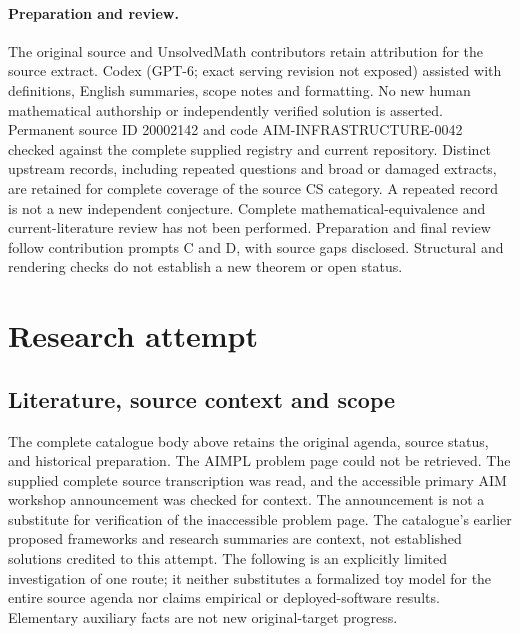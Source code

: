 \documentclass[11pt]{article}
\begin{document}
\paragraph{Preparation and review.}
The original source and UnsolvedMath contributors retain attribution for the source extract. Codex (GPT-6; exact serving revision not exposed) assisted with definitions, English summaries, scope notes and formatting. No new human mathematical authorship or independently verified solution is asserted. Permanent source ID 20002142 and code AIM-INFRASTRUCTURE-0042 checked against the complete supplied registry and current repository. Distinct upstream records, including repeated questions and broad or damaged extracts, are retained for complete coverage of the source CS category. A repeated record is not a new independent conjecture. Complete mathematical-equivalence and current-literature review has not been performed. Preparation and final review follow contribution prompts C and D, with source gaps disclosed. Structural and rendering checks do not establish a new theorem or open status.
\label{end:20002142}

\section{Research attempt}
\subsection{Literature, source context and scope}
The complete catalogue body above retains the original agenda, source status, and historical preparation. The AIMPL problem page could not be retrieved. The supplied complete source transcription was read, and the accessible primary AIM workshop announcement was checked for context. The announcement is not a substitute for verification of the inaccessible problem page. The catalogue's earlier proposed frameworks and research summaries are context, not established solutions credited to this attempt. The following is an explicitly limited investigation of one route; it neither substitutes a formalized toy model for the entire source agenda nor claims empirical or deployed-software results. Elementary auxiliary facts are not new original-target progress.
\end{document}
